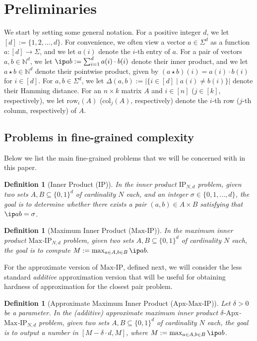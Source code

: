 \documentclass[11pt]{article}
\theoremstyle{plain}
\newtheorem{defn}[thm]{Definition}
\theoremstyle{remark}
\newcommand{\N}{\mathbb{N}}
\newcommand{\IP}{\mathrm{IP}}
\newcommand{\Max}{\mathrm{Max}}
\newcommand{\Apx}{\mathrm{Apx}}
\newcommand{\row}{\mathrm{row}}
\newcommand{\col}{\mathrm{col}}
\begin{document}
\section{Preliminaries}\label{sec:prelim}


We start by setting some general notation.
For a positive integer $d$, we let $[d]:=\{1,2, \ldots, d\}$.  For convenience, we often view a vector $a \in \Sigma^d$ as a function $a:[d] \to \Sigma$, and we let $a(i)$ denote the $i$-th entry of $a$. 
For a pair of vectors $a,b \in \N^d$, we let $\ip a b := \sum_{i=1}^d a(i) \cdot b(i)$ denote their inner product,  and we let $a \star b \in \N^d$ denote their pointwise product, given by $(a \star b)(i) = a(i) \cdot b(i)$ for $i \in [d]$. For $a,b \in \Sigma^d$, we let $\Delta(a,b):=|\{i \in [d] \mid a(i) \neq b(i)\}|$ denote their \textsf{Hamming distance}.
For an $n \times k$ matrix $A$ and $i\in [n]$ ($j \in [k]$, respectively),
we let $\row_i(A)$ ($\col_j(A)$, respectively) denote the $i$-th row ($j$-th column, respectively) of $A$.

\subsection{Problems in fine-grained complexity}

Below we list the main fine-grained problems that we will be concerned with in this paper.


\begin{defn}[Inner Product ($\IP$)] In  the \textsf{ inner product $\IP_{N,d}$ problem},
given two sets $A, B\subseteq\{0,1\}^d$
of cardinality $N$ each, and an integer $\sigma \in \{0,1,\ldots, d\}$, the goal is to determine whether there exists a pair $(a,b)\in A\times B$ satisfying that $\ip a b = \sigma$.
\end{defn}

\begin{defn}[Maximum  Inner Product ($\Max$-$\IP$)] In  the \textsf{maximum inner product $\Max$-$\IP_{N,d}$ problem},
given two sets $A, B\subseteq\{0,1\}^d$
of cardinality $N$ each, the goal is to compute 
$M:=\max_{a \in A, b \in B} \ip a b.$
\end{defn}

For the approximate version of $\Max$-$\IP$, defined next, we will consider the less standard \emph{additive} approximation version that will be useful for obtaining  hardness of approximation  for the closest pair problem.

\begin{defn}[Approximate Maximum Inner Product ($\Apx$-$\Max$-$\IP$)] 
Let $\delta >0$ be a parameter.
In  the \textsf{(additive) approximate maximum inner product $\delta$-$\Apx$-$\Max$-$\IP_{N,d}$ problem},
given two sets $A, B\subseteq\{0,1\}^d$ of cardinality $N$ each, the goal is to output a number in $[M-\delta\cdot d, M]$, where $M:=\max_{a \in A, b \in B} \ip a b$.
\end{defn}
\end{document}
